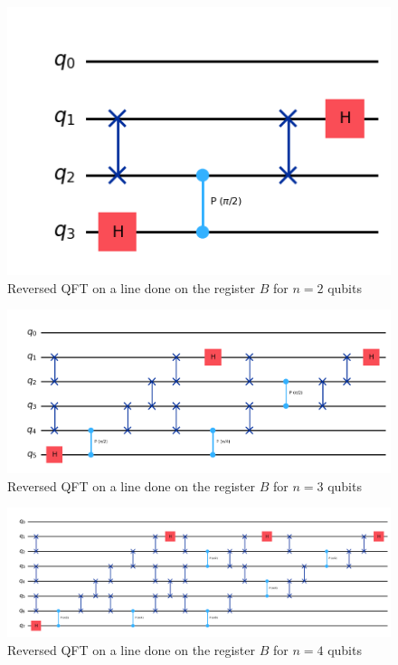 \begin{figure}[H]
    \centering
    \includegraphics*[scale=0.5]{images/reversed_qft_fpe_2_qubits.png}
    \caption{Reversed QFT on a line done on the register $B$ for $n=2$ qubits}
    \label{reversed_qft_fpe_2_qubits}
\end{figure}

\begin{figure}[H]
    \centering
    \includegraphics*[scale=0.45]{images/reversed_qft_fpe_3_qubits.png}
    \caption{Reversed QFT on a line done on the register $B$ for $n=3$ qubits}
    \label{reversed_qft_fpe_3_qubits}
\end{figure}

\begin{figure}[H]
    \centering
    \includegraphics*[scale=0.4]{images/reversed_qft_fpe_4_qubits.png}
    \caption{Reversed QFT on a line done on the register $B$ for $n=4$ qubits}
    \label{reversed_qft_fpe_4_qubits}
\end{figure}

